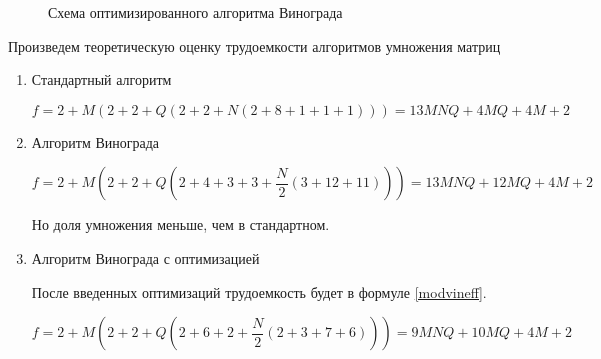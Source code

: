 \documentclass[a4paper,12pt]{article}
\begin{document}
\begin{figure}[H]
    \caption{Схема оптимизированного алгоритма Винограда}
    \label{img:modvinograd}
\end{figure}

Произведем теоретическую оценку трудоемкости алгоритмов умножения матриц

\begin{enumerate}
    \item Стандартный алгоритм

        \begin{equation}
            f = 2 + M(2 + 2 + Q(2 + 2 + N(2 + 8 + 1 + 1 + 1))) =
            13MNQ + 4MQ + 4M + 2
        \end{equation}

    \item Алгоритм Винограда

        \begin{equation}
            f = 2 + M(2 + 2 + Q(2 + 4 + 3 + 3 + \frac{N}{2}(3 + 12 + 11))) =
            13MNQ + 12MQ + 4M + 2
        \end{equation}

        Но доля умножения меньше, чем в стандартном.

    \item Алгоритм Винограда с оптимизацией

        После введенных оптимизаций трудоемкость будет в формуле \ref{modvineff}.

        \begin{equation}\label{modvineff}
            f = 2 + M(2 + 2 + Q(2 + 6 + 2 + \frac{N}{2}(2 + 3 + 7 + 6))) =
            9MNQ + 10MQ + 4M + 2
        \end{equation}
\end{enumerate}
\end{document}
